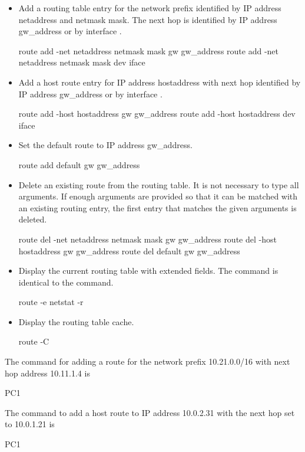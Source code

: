 \begin{itemize}
	\item Add a routing table entry for the network prefix identified by IP address netaddress and netmask mask. The next hop is identified by IP address gw\_address or by interface .
		\begin{cmdblock}
	route add -net netaddress netmask mask gw gw_address 
	route add -net netaddress netmask mask dev iface
		\end{cmdblock}
	\item Add a host route entry for IP address hostaddress with next hop identified by IP address gw\_address or by interface .
		\begin{cmdblock}
	route add -host hostaddress gw gw_address 
	route add -host hostaddress dev iface
		\end{cmdblock}
	\item Set the default route to IP address gw\_address.
		\begin{cmdblock}
	route add default gw gw_address
		\end{cmdblock}
	\item Delete an existing route from the routing table. It is not necessary to type all arguments. If enough arguments are provided so that it can be matched with an existing routing entry, the first entry that matches the given arguments is deleted.
		\begin{cmdblock}
	route del -net netaddress netmask mask gw gw_address 
	route del -host hostaddress gw gw_address
	route del default gw gw_address
		\end{cmdblock}
	\item Display the current routing table with extended fields. The command is identical to the  command.
		\begin{cmdblock}
	route -e 
	netstat -r
		\end{cmdblock}
	\item Display the routing table cache.
		\begin{cmdblock}
	route -C
		\end{cmdblock}
\end{itemize}

The command for adding a route for the network prefix 10.21.0.0/16 with next hop address 10.11.1.4 is
\begin{cmdblock}
	PC1%
\end{cmdblock}

The command to add a host route to IP address 10.0.2.31 with the next hop set to 10.0.1.21 is
\begin{cmdblock}
	PC1%
\end{cmdblock}

